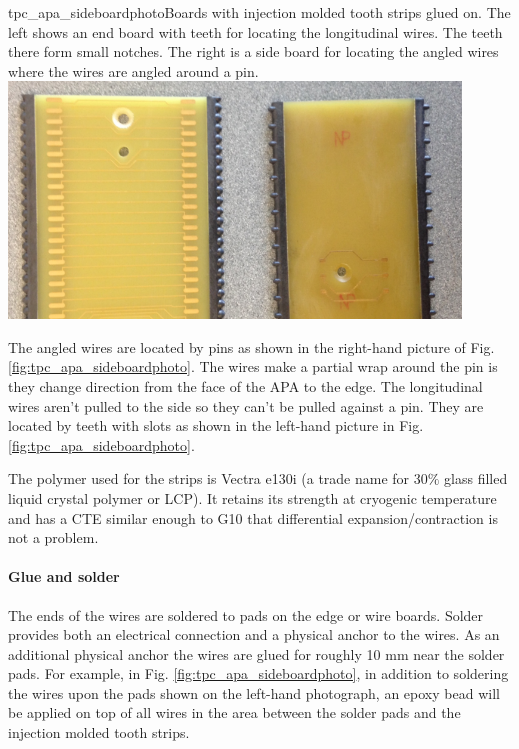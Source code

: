 \begin{cdrfigure}{tpc_apa_sideboardphoto}{Boards with injection molded tooth strips glued on.  The left shows an end board with teeth for locating the longitudinal wires.  The teeth there form small notches. The right is a side board for locating the angled wires where the wires are angled around a pin.}
\includegraphics[width=0.9\textwidth]{figures/tpc_apa_sideboardphoto.png} 
\end{cdrfigure}

The angled wires are located by pins as shown in the right-hand picture of Fig. \ref{fig:tpc_apa_sideboardphoto}.  The wires make a partial wrap around the pin is they change direction from the face of the APA to the edge.  The longitudinal wires aren't pulled to the side so they can't be pulled against a pin.  They are located by teeth with slots as shown in the left-hand picture in Fig. \ref{fig:tpc_apa_sideboardphoto}. 
	
The polymer used for the strips is Vectra e130i (a trade name for 30$\%$ glass filled liquid crystal polymer or LCP). It retains its strength at cryogenic temperature and has a CTE similar enough to G10 that differential expansion/contraction is not a problem.

\paragraph{Glue and solder}
The ends of the wires are soldered to pads on the edge or wire boards.  Solder provides both an electrical connection and a physical anchor to the wires.  As an additional physical anchor the wires are glued for roughly 10 mm near the solder pads.  For example, in Fig. \ref{fig:tpc_apa_sideboardphoto}, in addition to soldering the wires upon the pads shown on the left-hand photograph, an epoxy bead will be applied on top of all wires in the area between the solder pads and the injection molded tooth strips.

